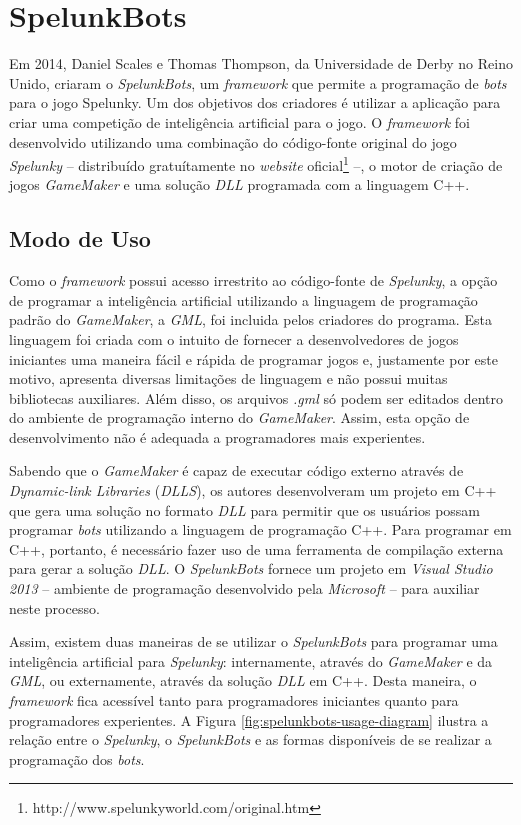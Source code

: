 \chapter{\label{chap:spelunkbots}SpelunkBots}
Em 2014, Daniel Scales e Thomas Thompson, da Universidade de Derby no Reino
Unido, criaram o \textit{SpelunkBots}\cite{SPELUNKBOTSPAPER}, um
\textit{framework} que permite a programação de \textit{bots} para o jogo
Spelunky. Um dos objetivos dos criadores é utilizar a aplicação para criar uma
competição de inteligência artificial para o jogo. O \textit{framework} foi
desenvolvido utilizando uma combinação do código-fonte original do jogo
\textit{Spelunky} -- distribuído gratuítamente no \textit{website}
oficial\footnote{http://www.spelunkyworld.com/original.htm} --, o motor de
criação de jogos \textit{GameMaker} e uma solução \textit{DLL} programada com a
linguagem C++.


\section{Modo de Uso}
Como o \textit{framework} possui acesso irrestrito ao código-fonte de
\textit{Spelunky}, a opção de programar a inteligência artificial utilizando a
linguagem de programação padrão do \textit{GameMaker}, a \textit{GML}, foi
incluida pelos criadores do programa. Esta linguagem foi criada com o intuito de
fornecer a desenvolvedores de jogos iniciantes uma maneira fácil e rápida de
programar jogos e, justamente por este motivo, apresenta diversas limitações de
linguagem e não possui muitas bibliotecas auxiliares. Além disso, os arquivos
\textit{.gml} só podem ser editados dentro do ambiente de programação interno do
\textit{GameMaker}. Assim, esta opção de desenvolvimento não é adequada a
programadores mais experientes.

Sabendo que o \textit{GameMaker} é capaz de executar código externo através de
\textit{Dynamic-link Libraries} (\textit{DLLS}), os autores desenvolveram um
projeto em C++ que gera uma solução no formato \textit{DLL} para permitir que os
usuários possam programar \textit{bots} utilizando a linguagem de programação
C++. Para programar em C++, portanto,  é necessário fazer uso de uma ferramenta de
compilação externa para gerar a solução \textit{DLL}. O \textit{SpelunkBots}
fornece um projeto em \textit{Visual Studio 2013} -- ambiente de programação
desenvolvido pela \textit{Microsoft} -- para auxiliar neste processo.

Assim, existem duas maneiras de se utilizar o \textit{SpelunkBots} para
programar uma inteligência artificial para \textit{Spelunky}: internamente,
através do \textit{GameMaker} e da \textit{GML}, ou externamente, através da
solução \textit{DLL} em C++. Desta maneira, o \textit{framework} fica acessível
tanto para programadores iniciantes quanto para programadores experientes.  A
Figura \ref{fig:spelunkbots-usage-diagram} ilustra a relação entre o
\textit{Spelunky}, o \textit{SpelunkBots} e as formas disponíveis de se realizar
a programação dos \textit{bots}.

